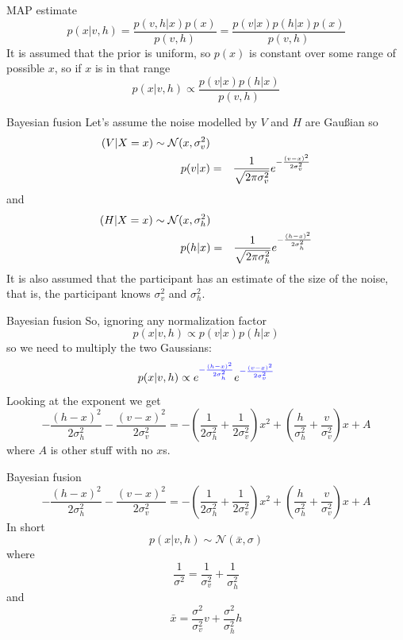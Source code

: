 \documentclass{beamer}
\newcommand{\crish}{\color{reddish}}
\newcommand{\cbla}{\color{black}}
\newcommand{\cred}{\color{red}}
\newcommand{\cblu}{\color{blue}}
\begin{document}
\begin{frame}{MAP estimate}
  \crish$$
p(x|v,h)=\frac{p(v,h|x)p(x)}{p(v,h)}=\frac{p(v|x)p(h|x)p(x)}{p(v,h)}
$$\cbla{}
It is assumed that the prior is uniform, so \crish$p(x)$\cbla{} is constant over some range of possible \crish$x$\cbla{}, so if \crish$x$\cbla{} is in that range
\crish$$
p(x|v,h)\propto \frac{p(v|x)p(h|x)}{p(v,h)}
$$\cbla{}
\end{frame}

\begin{frame}{Bayesian fusion}
  Let's assume the noise modelled by \cblu$V$\cbla{} and \cred$H$\cbla{} are Gau\ss{}ian so
\crish
  \begin{eqnarray*}
    (V|X=x)\sim{}\mathcal{N}(x,\sigma_v^2)\cr
    p(v|x)&=&\frac{1}{\sqrt{2\pi\sigma_v^2}}e^{-\frac{(v-x)^2}{2\sigma_v^2}}
  \end{eqnarray*}
  \cbla{}
  and
    \crish
  \begin{eqnarray*}
    (H|X=x)\sim{}\mathcal{N}(x,\sigma_h^2)\cr
    p(h|x)&=&\frac{1}{\sqrt{2\pi\sigma_h^2}}e^{-\frac{(h-x)^2}{2\sigma_h^2}}
  \end{eqnarray*}
  \cbla{}
  It is also assumed that the participant has an estimate of the size of the noise, that is, the participant knows \crish$\sigma_v^2$\cbla{} and \crish$\sigma_h^2$\cbla{}.
\end{frame}
  

\begin{frame}{Bayesian fusion}
So, ignoring any normalization factor
  \crish$$
  p(x|v,h)\propto p(v|x)p(h|x)
  $$\cbla{}
  so we need to multiply the two Gaussians:
  \crish$$
  p(x|v,h)\propto e^{\cblu-\frac{(h-x)^2}{2\sigma_h^2}\cbla}e^{\cblu-\frac{(v-x)^2}{2\sigma_v^2}\cbla}
  $$\cbla{}
  Looking at the exponent we get
\cblu$$
-\frac{(h-x)^2}{2\sigma_h^2}-\frac{(v-x)^2}{2\sigma_v^2}=-\left(\frac{1}{2\sigma_h^2}+\frac{1}{2\sigma_v^2}\right)x^2+\left(\frac{h}{\sigma_h^2}+\frac{v}{\sigma_v^2}\right)x+A
    $$\cbla{}
  where \cblu$A$\cbla{} is other stuff with no \cblu$x$\cbla{}s.
  \end{frame}


\begin{frame}{Bayesian fusion}
\crish$$
-\frac{(h-x)^2}{2\sigma_h^2}-\frac{(v-x)^2}{2\sigma_v^2}=-\left(\frac{1}{2\sigma_h^2}+\frac{1}{2\sigma_v^2}\right)x^2+\left(\frac{h}{\sigma_h^2}+\frac{v}{\sigma_v^2}\right)x+A
    $$\cbla{}
In short
\crish$$
p(x|v,h)\sim \mathcal{N}(\bar{x},\sigma)
$$\cbla{}
where
\crish$$
\frac{1}{\sigma^2}=\frac{1}{\sigma_v^2}+\frac{1}{\sigma_h^2}
$$\cbla{}
and
\crish$$
\bar{x}=\frac{\sigma^2}{\sigma_v^2}v+\frac{\sigma^2}{\sigma_h^2}h
$$\cbla{}
\end{frame}
\end{document}
